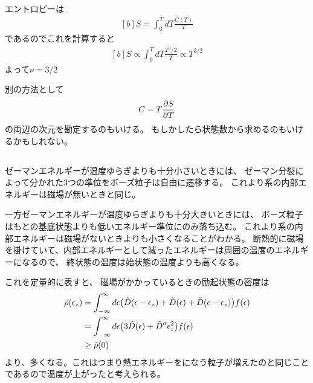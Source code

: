 \documentclass[../../master.tex]{subfiles}
\begin{document}
\subsection{}
エントロピーは
\begin{equation}\begin{aligned}[b]
    S = \int_{0}^{T}dT \frac{C(T)}{T}
\end{aligned}\end{equation}
であるのでこれを計算すると
\begin{equation}\begin{aligned}[b]
    S \propto \int_{0}^{T}dT\frac{T^3/2}{T} \propto T^{3/2}
\end{aligned}\end{equation}
よって\(\nu =3/2\)

別の方法として
\begin{equation}\begin{aligned}[b]
    C = T\pdv{S}{T}
\end{aligned}\end{equation}
の両辺の次元を勘定するのもいける。
もしかしたら状態数から求めるのもいけるかもしれない。

\subsection{}
ゼーマンエネルギーが温度ゆらぎよりも十分小さいときには、
ゼーマン分裂によって分かれた3つの準位をボーズ粒子は自由に遷移する。
これより系の内部エネルギーは磁場が無いときと同じ。

一方ゼーマンエネルギーが温度ゆらぎよりも十分大きいときには、
ボーズ粒子はもとの基底状態よりも低いエネルギー準位にのみ落ち込む。
これより系の内部エネルギーは磁場がないときよりも小さくなることがわかる。
断熱的に磁場を掛けていて、内部エネルギーとして減ったエネルギーは周囲の温度のエネルギーになるので、
終状態の温度は始状態の温度よりも高くなる。

これを定量的に表すと、
磁場がかかっているときの励起状態の密度は
\begin{equation}\begin{aligned}[b]
    \tilde{\rho}(\epsilon_z)
        &= \int_{-\infty}^{\infty} d\epsilon \qty(
            \tilde{D}(\epsilon-\epsilon_z)+\tilde{D}(\epsilon)+\tilde{D}(\epsilon-\epsilon_z))f(\epsilon)\\
        &= \int_{-\infty}^{\infty} d\epsilon \qty(
            3\tilde{D}(\epsilon)+\tilde{D}''\epsilon_z^2 )f(\epsilon)\\
        &\ge \tilde{\rho}(0)
\end{aligned}\end{equation}
より、多くなる。これはつまり熱エネルギーをになう粒子が増えたのと同じことであるので温度が上がったと考えられる。
\end{document}

